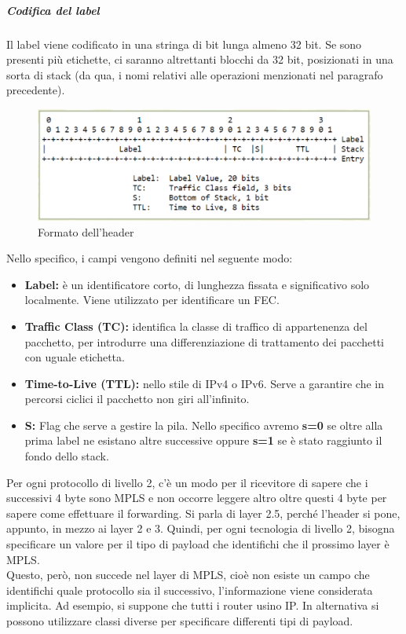 \documentclass{article}
\begin{document}
\subparagraph{Codifica del label} Il label viene codificato in una stringa di bit lunga almeno 32 bit. Se sono presenti più etichette, ci saranno altrettanti blocchi da 32 bit, posizionati in una sorta di stack (da qua, i nomi relativi alle operazioni menzionati nel paragrafo precedente).
\begin{figure}[H]
    \centering
    \includegraphics[scale=0.4]{figures/mpls header.png}
    \caption{Formato dell'header}
\end{figure}
Nello specifico, i campi vengono definiti nel seguente modo:
\begin{itemize}
    \item \textbf{Label:} è un identificatore corto, di lunghezza fissata e significativo solo localmente. Viene utilizzato per identificare un FEC.
    \item \textbf{Traffic Class (TC):} identifica la classe di traffico di appartenenza del pacchetto, per introdurre una differenziazione di trattamento dei pacchetti con uguale etichetta.
    \item \textbf{Time-to-Live (TTL):} nello stile di IPv4 o IPv6. Serve a garantire che in percorsi ciclici il pacchetto non giri all'infinito.
    \item \textbf{S:} Flag che serve a gestire la pila. Nello specifico avremo \textbf{s=0} se oltre alla prima label ne esistano altre successive oppure \textbf{s=1} se è stato raggiunto il fondo dello stack.
\end{itemize}
Per ogni protocollo di livello 2, c'è un modo per il ricevitore di sapere che i successivi 4 byte sono MPLS e non occorre leggere altro oltre questi 4 byte per sapere come effettuare il forwarding. Si parla di layer 2.5, perché l'header si pone, appunto, in mezzo ai layer 2 e 3. Quindi, per ogni tecnologia di livello 2, bisogna specificare un valore per il tipo di payload che identifichi che il prossimo layer è MPLS. \\ Questo, però, non succede nel layer di MPLS, cioè non esiste un campo che identifichi quale protocollo sia il successivo, l'informazione viene considerata implicita. Ad esempio, si suppone che tutti i router usino IP. In alternativa si possono utilizzare classi diverse per specificare differenti tipi di payload.
\end{document}
